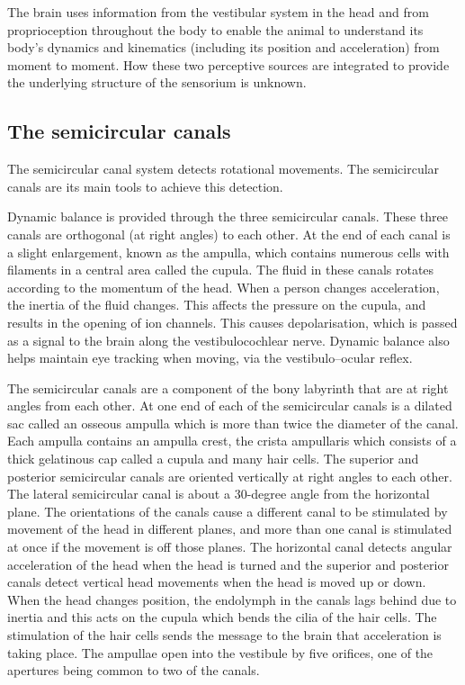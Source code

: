 The brain uses information from the vestibular system in the head and from proprioception throughout the body to enable the animal to understand its body's dynamics and kinematics (including its position and acceleration) from moment to moment. How these two perceptive sources are integrated to provide the underlying structure of the sensorium is unknown.

\hypertarget{the-semicircular-canals}{%
\subsection{The semicircular canals}\label{the-semicircular-canals}}

The semicircular canal system detects rotational movements. The semicircular canals are its main tools to achieve this detection.

Dynamic balance is provided through the three semicircular canals. These three canals are orthogonal (at right angles) to each other. At the end of each canal is a slight enlargement, known as the ampulla, which contains numerous cells with filaments in a central area called the cupula. The fluid in these canals rotates according to the momentum of the head. When a person changes acceleration, the inertia of the fluid changes. This affects the pressure on the cupula, and results in the opening of ion channels. This causes depolarisation, which is passed as a signal to the brain along the vestibulocochlear nerve. Dynamic balance also helps maintain eye tracking when moving, via the vestibulo--ocular reflex.

The semicircular canals are a component of the bony labyrinth that are at right angles from each other. At one end of each of the semicircular canals is a dilated sac called an osseous ampulla which is more than twice the diameter of the canal. Each ampulla contains an ampulla crest, the crista ampullaris which consists of a thick gelatinous cap called a cupula and many hair cells. The superior and posterior semicircular canals are oriented vertically at right angles to each other. The lateral semicircular canal is about a 30-degree angle from the horizontal plane. The orientations of the canals cause a different canal to be stimulated by movement of the head in different planes, and more than one canal is stimulated at once if the movement is off those planes. The horizontal canal detects angular acceleration of the head when the head is turned and the superior and posterior canals detect vertical head movements when the head is moved up or down. When the head changes position, the endolymph in the canals lags behind due to inertia and this acts on the cupula which bends the cilia of the hair cells. The stimulation of the hair cells sends the message to the brain that acceleration is taking place. The ampullae open into the vestibule by five orifices, one of the apertures being common to two of the canals.

